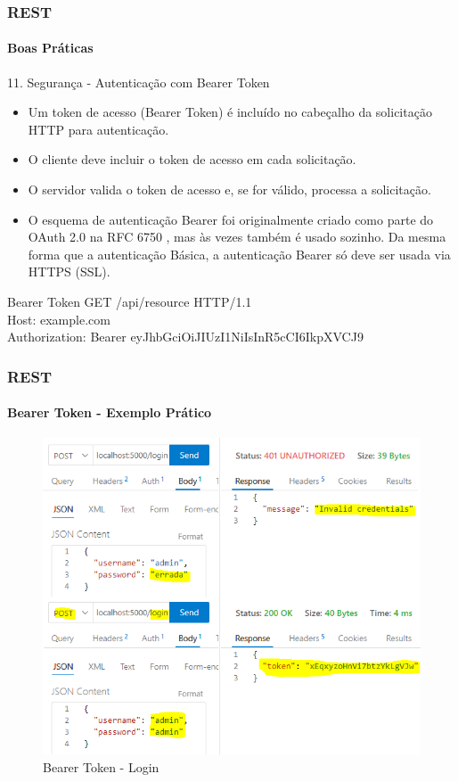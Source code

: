 \documentclass[
	9pt, %
	t, %
]{beamer}
\begin{document}
\begin{frame}
	\frametitle{REST}
	\framesubtitle{Boas Práticas}

	\begin{block}{{\small 11. Segurança - Autenticação com Bearer Token}}
		{ \small
			\begin{itemize}
				\item Um token de acesso (Bearer Token) é incluído no cabeçalho da solicitação HTTP
				      para autenticação.
				\item O cliente deve incluir o token de acesso em cada solicitação.
				\item O servidor valida o token de acesso e, se for válido, processa a solicitação.
				\item O esquema de autenticação Bearer foi originalmente criado como parte do OAuth
				      2.0 na RFC 6750 , mas às vezes também é usado sozinho. Da mesma forma que a
				      autenticação Básica, a autenticação Bearer só deve ser usada via HTTPS (SSL).
			\end{itemize}
		}
	\end{block}

	\begin{exampleblock}{Bearer Token}
		{ \small GET /api/resource HTTP/1.1 } \\
		{ \small Host: example.com } \\
		{ \small Authorization: Bearer eyJhbGciOiJIUzI1NiIsInR5cCI6IkpXVCJ9 } \\
	\end{exampleblock}

\end{frame}

\begin{frame}
	\frametitle{REST}
	\framesubtitle{Bearer Token - Exemplo Prático}

	\begin{figure}
		\includegraphics[width=0.7\linewidth]{bearer_login.png}
		\caption{Bearer Token - Login}
		\label{fig:bearer_token_login}
	\end{figure}

\end{frame}
\end{document}
